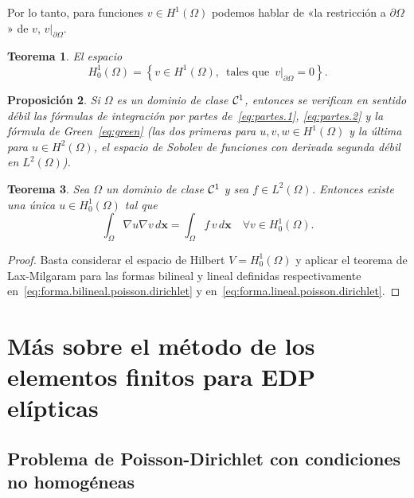 \documentclass[11pt]{report}
\theoremstyle{plain}
\newtheorem{theorem}{Teorema}[chapter]
\newtheorem{proposition}[theorem]{Proposición}
\theoremstyle{definition}
\newcommand{\xx}{\ensuremath{\mathbf{x}}\xspace}
\newcommand{\grad}{\ensuremath{\nabla}}
\newcommand{\classC}[2]{%
  \ensuremath{
   \ifthenelse{\equal{#2}{}}
    {\mathcal{C}^{#1}}
    {\mathcal{C}^{#1}(#2)}
  }
}
\begin{document}
Por lo tanto, para funciones $v\in H^1(\Omega)$ podemos hablar de «la restricción a $\partial\Omega$» de $v$, $v|_{\partial\Omega}$.

\begin{theorem}
  El espacio 
  \begin{displaymath}
  H_0^1(\Omega) = \left\{ v\in H^1(\Omega), \enspace\text{tales que}
  \enspace v|_{\partial\Omega}=0 \right\}.
  \end{displaymath}
\end{theorem}

\begin{proposition} 
  Si $\Omega$ es un dominio de clase $\classC1{}$, entonces se verifican en sentido débil las fórmulas de integración por partes de~\eqref{eq:partes.1}, \eqref{eq:partes.2} y  la fórmula de Green~\eqref{eq:green} (las dos primeras para $u,v,w\in H^1(\Omega)$ y la última para $u\in H^2(\Omega)$, el espacio de Sobolev de funciones con derivada segunda débil en $L^2(\Omega)$).
\end{proposition}

\begin{theorem}
  \label{teo:existencia.poisson.dirichlet}
  Sea $\Omega$ un dominio de clase $\classC1{}$ y sea $f\in L^2(\Omega)$. Entonces existe una única $u\in H_0^1(\Omega)$ tal que 
  \begin{displaymath}
    \int_\Omega \grad u\grad v\, d\xx = \int_\Omega f\, v\, d\xx \quad\forall v\in H_0^1(\Omega).
  \end{displaymath}
\end{theorem}

\begin{proof}
  Basta considerar el espacio de Hilbert $V=H_0^1(\Omega)$ y aplicar el teorema de Lax-Milgaram para las formas bilineal y lineal definidas respectivamente en~\eqref{eq:forma.bilineal.poisson.dirichlet} y en~\eqref{eq:forma.lineal.poisson.dirichlet}.
\end{proof}

\chapter{Más sobre el método de los elementos finitos para EDP elípticas}

\section{Problema de Poisson-Dirichlet con condiciones no homogéneas}
\end{document}
